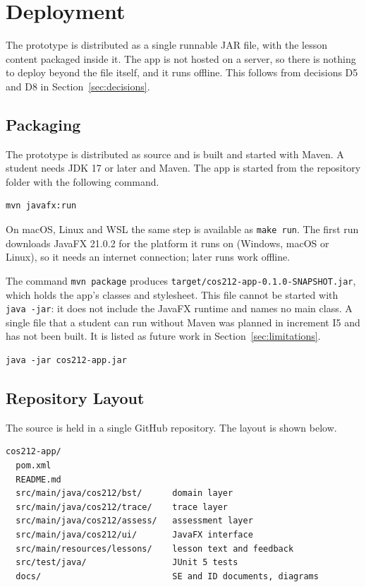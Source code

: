 \section{Deployment}\label{sec:deployment}


The prototype is distributed as a single runnable JAR file, with the lesson content packaged inside it. The app is not hosted on a server, so there is nothing to deploy beyond the file itself, and it runs offline. This follows from decisions D5 and D8 in Section~\ref{sec:decisions}.

\subsection{Packaging}
The prototype is distributed as source and is built and started with Maven. A student needs JDK 17 or later and Maven. The app is started from the repository folder with the following command.

\begin{lstlisting}
mvn javafx:run
\end{lstlisting}

On macOS, Linux and WSL the same step is available as \texttt{make run}. The first run downloads JavaFX 21.0.2 for the platform it runs on (Windows, macOS or Linux), so it needs an internet connection; later runs work offline.

The command \texttt{mvn package} produces \texttt{target/cos212-app-0.1.0-SNAPSHOT.jar}, which holds the app's classes and stylesheet. This file cannot be started with \texttt{java -jar}: it does not include the JavaFX runtime and names no main class. A single file that a student can run without Maven was planned in increment I5 and has not been built. It is listed as future work in Section~\ref{sec:limitations}.

\begin{lstlisting}
java -jar cos212-app.jar
\end{lstlisting}

\subsection{Repository Layout}
The source is held in a single GitHub repository. The layout is shown below.

\begin{lstlisting}
cos212-app/
  pom.xml
  README.md
  src/main/java/cos212/bst/      domain layer
  src/main/java/cos212/trace/    trace layer
  src/main/java/cos212/assess/   assessment layer
  src/main/java/cos212/ui/       JavaFX interface
  src/main/resources/lessons/    lesson text and feedback
  src/test/java/                 JUnit 5 tests
  docs/                          SE and ID documents, diagrams
\end{lstlisting}

